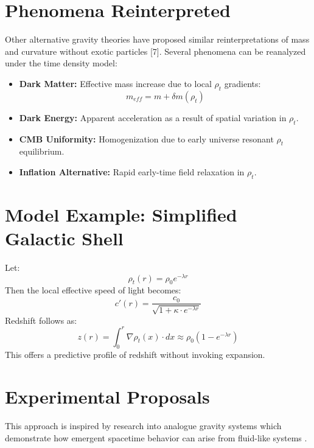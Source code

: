 \documentclass[12pt]{article}
\begin{document}
\section{Phenomena Reinterpreted}
Other alternative gravity theories have proposed similar reinterpretations of mass and curvature without exotic particles [7].
Several phenomena can be reanalyzed under the time density model:
\begin{itemize}
  \item \textbf{Dark Matter:} Effective mass increase due to local $\rho_t$ gradients:
    \[ m_{eff} = m + \delta m(\rho_t) \]
  \item \textbf{Dark Energy:} Apparent acceleration as a result of spatial variation in $\rho_t$.
  \item \textbf{CMB Uniformity:} Homogenization due to early universe resonant $\rho_t$ equilibrium.
  \item \textbf{Inflation Alternative:} Rapid early-time field relaxation in $\rho_t$.
\end{itemize}

\section{Model Example: Simplified Galactic Shell}
Let:
\[ \rho_t(r) = \rho_0 e^{-\lambda r} \]
Then the local effective speed of light becomes:
\[ c'(r) = \frac{c_0}{\sqrt{1 + \kappa \cdot e^{-\lambda r}}} \]
Redshift follows as:
\[ z(r) = \int_0^r \nabla \rho_t(x) \cdot dx \approx \rho_0 (1 - e^{-\lambda r}) \]
This offers a predictive profile of redshift without invoking expansion.

\section{Experimental Proposals}
This approach is inspired by research into analogue gravity systems which demonstrate how emergent spacetime behavior can arise from fluid-like systems \cite{barcelo2011}.
\end{document}
